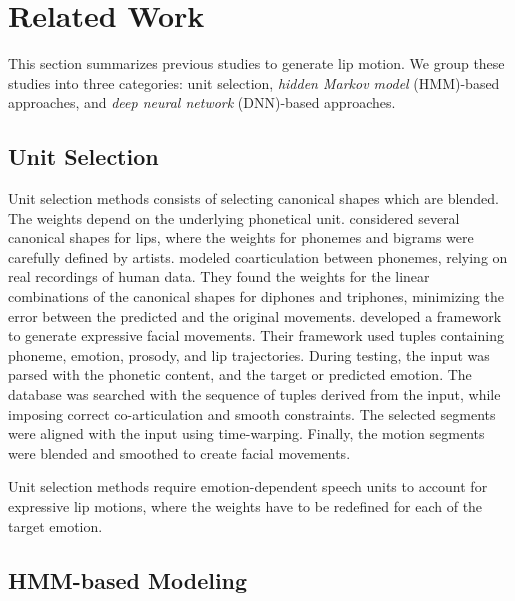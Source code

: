 \documentclass[10pt,journal,compsoc]{IEEEtran}
\begin{document}
\section{Related Work}
\label{sec:relatedwork}

This section summarizes  previous studies to generate lip motion. We group these studies into three categories: unit selection, \emph{hidden Markov model} (HMM)-based approaches, and \emph{deep neural network} (DNN)-based approaches. 

\subsection{Unit Selection}
\label{ssec:unit}


Unit selection methods consists of selecting canonical shapes which are blended. The weights depend on the underlying phonetical unit. \citet{Xu_2013} considered several canonical shapes for lips, where the weights for phonemes and bigrams were carefully defined by artists. \citet{Deng_2005_2} modeled coarticulation between phonemes, relying on real recordings of human data. They found the weights for the linear combinations of the canonical shapes for diphones and triphones, minimizing the error between the predicted and the original movements. \citet{Cao_2005} developed a framework to generate expressive facial movements. Their framework used tuples containing phoneme, emotion, prosody, and lip trajectories. During testing, the input was parsed with the phonetic content, and the target or predicted emotion. The database was searched with the sequence of tuples derived from the input, while imposing correct co-articulation and smooth constraints. The selected segments were aligned with the input using time-warping. Finally, the motion segments were blended and smoothed to create facial movements. 

Unit selection methods require emotion-dependent speech units to account for expressive lip motions, where the weights have to be redefined for each of the target emotion. 

\subsection{HMM-based Modeling}
\label{ssec:gen}
	
\end{document}
